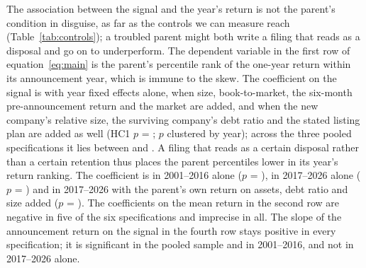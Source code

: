 The association between the signal and the year's return is not the parent's condition in disguise, as far as the controls we can measure reach (Table~\ref{tab:controls}); a troubled parent might both write a filing that reads as a disposal and go on to underperform. The dependent variable in the first row of equation~\ref{eq:main} is the parent's percentile rank of the one-year return within its announcement year, which is immune to the skew. The coefficient on the signal is \RankSpecOneCoef{} with year fixed effects alone, \RankSpecTwoCoef{} when size, book-to-market, the six-month pre-announcement return and the market are added, and \RankSpecThreeCoef{} when the new company's relative size, the surviving company's debt ratio and the stated listing plan are added as well (HC1 $p$ = \RankSpecThreeP; $p$ \RankSpecThreeClP{} clustered by year); across the three pooled specifications it lies between \RankScoreCoefMin{} and \RankScoreCoefMax{}. A filing that reads as a certain disposal rather than a certain retention thus places the parent \RankSpecThreePctl{} percentiles lower in its year's return ranking. The coefficient is \RankSpecThreeBCoef{} in 2001--2016 alone ($p$ = \RankSpecThreeBP), \RankSpecThreeCCoef{} in 2017--2026 alone ($p$ = \RankSpecThreeCP) and \RankSpecFourCoef{} in 2017--2026 with the parent's own return on assets, debt ratio and size added ($p$ = \RankSpecFourP). The coefficients on the mean return in the second row are negative in five of the six specifications and imprecise in all. The slope of the announcement return on the signal in the fourth row stays positive in every specification; it is significant in the pooled sample and in 2001--2016, and not in 2017--2026 alone.

\begin{table}
\centering
\caption{Returns on the disposal signal with controls}\label{tab:controls}
{\footnotesize\setlength{\tabcolsep}{3pt}}
\end{table}

